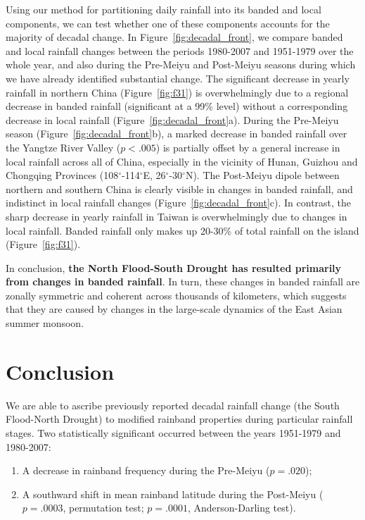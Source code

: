 \documentclass{ametsoc}
\begin{document}
	Using our method for partitioning daily rainfall into its banded and local components, we can test whether one of these components accounts for the majority of decadal change. In Figure~\ref{fig:decadal_front}, we compare banded and local rainfall changes between the periods 1980-2007 and 1951-1979 over the whole year, and also during the Pre-Meiyu and Post-Meiyu seasons during which we have already identified substantial change. The significant decrease in yearly rainfall in northern China (Figure~\ref{fig:f31}) is overwhelmingly due to a regional decrease in banded rainfall (significant at a 99\% level) without a corresponding decrease in local rainfall (Figure~\ref{fig:decadal_front}a). During the Pre-Meiyu season (Figure~\ref{fig:decadal_front}b), a marked decrease in banded rainfall over the Yangtze River Valley ($p<.005$) is partially offset by a general increase in local rainfall across all of China, especially in the vicinity of Hunan, Guizhou and Chongqing Provinces (108$^\circ$-114$^\circ$E, 26$^\circ$-30$^\circ$N). The Post-Meiyu dipole between northern and southern China is clearly visible in changes in banded rainfall, and indistinct in local rainfall changes (Figure~\ref{fig:decadal_front}c). In contrast, the sharp decrease in yearly rainfall in Taiwan is overwhelmingly due to changes in local rainfall. Banded rainfall only makes up 20-30\% of total rainfall on the island (Figure~\ref{fig:f31}).

	In conclusion, \textbf{the North Flood-South Drought has resulted primarily from changes in banded rainfall}. In turn, these changes in banded rainfall are zonally symmetric and coherent across thousands of kilometers, which suggests that they are caused by changes in the large-scale dynamics of the East Asian summer monsoon.

\section{Conclusion}
	
	We are able to ascribe previously reported decadal rainfall change (the South Flood-North Drought) to modified rainband properties during particular rainfall stages. Two statistically significant occurred between the years 1951-1979 and 1980-2007: 

\begin{enumerate} 
\item A decrease in rainband frequency during the Pre-Meiyu ($p=.020$);
\item A southward shift in mean rainband latitude during the Post-Meiyu ($p=.0003$, permutation test; $p=.0001$, Anderson-Darling test). 
\end{enumerate}
	
\end{document}
